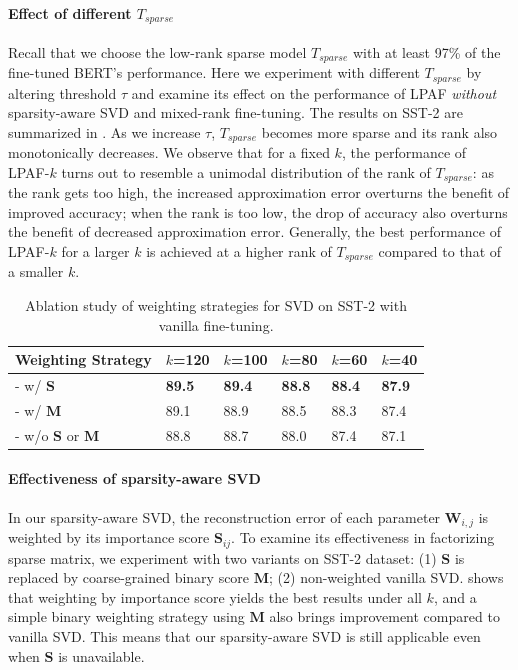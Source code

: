 \paragraph{Effect of different $T_{sparse}$} 
Recall that we choose the low-rank sparse model $T_{sparse}$ with at least 97\% of the fine-tuned BERT's performance. Here we experiment with different $T_{sparse}$ by altering threshold $\tau$ and examine its effect on the performance of LPAF \textit{without} sparsity-aware SVD and mixed-rank fine-tuning.
The results on SST-2 are summarized in . As we increase $\tau$, $T_{sparse}$ becomes more sparse and its rank also monotonically decreases. We observe that for a fixed $k$, the performance of LPAF-$k$ turns out to resemble a unimodal distribution of the rank of $T_{sparse}$: as the rank gets too high, the increased approximation error overturns the benefit of improved accuracy; when the rank is too low, the drop of accuracy also overturns the benefit of decreased approximation error. Generally, the best performance of LPAF-$k$ for a larger $k$ is achieved at a higher rank of $T_{sparse}$ compared to that of a smaller $k$.


\begin{table}[t]
	\centering
	\scriptsize
	\begin{tabular}{|l|lllll|}
		\hline
		Weighting Strategy         &$k$=120  & $k$=100  & $k$=80   & $k$=60   & $k$=40   \\
		\hline
		- w/ $\bm{S}$    &\textbf{89.5}  & \textbf{89.4} & \textbf{88.8} & \textbf{88.4} & \textbf{87.9} \\
		- w/ $\bm{M}$   &89.1   & 88.9 & 88.5 & 88.3 & 87.4 \\
		- w/o $\bm{S}$ or $\bm{M}$ &88.8 & 88.7 & 88.0 & 87.4 & 87.1 \\
		\hline
	\end{tabular}
	\caption{Ablation study of weighting strategies for SVD on SST-2 with vanilla fine-tuning.}
	\label{table:diffsvd}
\end{table}

\paragraph{Effectiveness of sparsity-aware SVD}
In our sparsity-aware SVD, the reconstruction error of each parameter $\bm{W}_{i,j}$ is weighted by its importance score $\bm{S}_{ij}$. To examine its effectiveness in factorizing sparse matrix, we experiment with two variants on SST-2 dataset: (1) $\bm{S}$ is replaced by coarse-grained binary score $\bm{M}$; (2) non-weighted vanilla SVD.  shows that weighting by importance score yields the best results under all $k$, and a simple binary weighting strategy using $\bm{M}$ also brings improvement compared to vanilla SVD. This means that our sparsity-aware SVD is still applicable even when $\bm{S}$ is unavailable.


